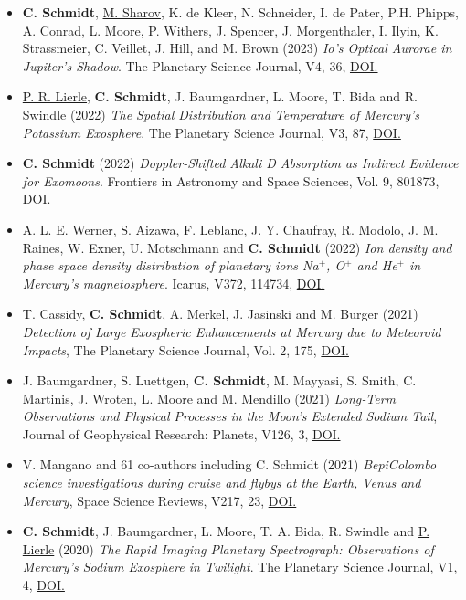 \documentclass[12pt]{report}
\begin{document}
\begin{itemize}
  \item \textbf{C. Schmidt}, \underline{M. Sharov}, K. de Kleer, N. Schneider, I. de Pater, P.H. Phipps, A. Conrad, L. Moore, P. Withers, J. Spencer, J. Morgenthaler, I. Ilyin, K. Strassmeier, C. Veillet, J. Hill, and M. Brown (2023) \textit{Io’s Optical Aurorae in Jupiter’s Shadow}. The Planetary Science Journal, V4, 36, \href{https://doi.org/10.3847/PSJ/ac85b0}{DOI.} 
  \item \underline{P. R. Lierle}, \textbf{C. Schmidt}, J. Baumgardner, L. Moore, T. Bida and R. Swindle (2022) \textit{The Spatial Distribution and Temperature of Mercury’s Potassium Exosphere}. The Planetary Science Journal, V3, 87, \href{https://doi.org/10.3847/PSJ/ac5c4d}{DOI.} 
  \item \textbf{C. Schmidt} (2022) \textit{Doppler-Shifted Alkali D Absorption as Indirect Evidence for Exomoons}. Frontiers in Astronomy and Space Sciences, Vol. 9, 801873, \href{https://doi.org/10.3389/fspas.2022.801873}{DOI.}
  \item A. L. E. Werner, S. Aizawa, F. Leblanc, J. Y. Chaufray, R. Modolo, J. M. Raines, W. Exner, U. Motschmann and \textbf{C. Schmidt} (2022) \textit{Ion density and phase space density distribution of planetary ions Na$^+$, O$^+$ and He$^+$ in Mercury's magnetosphere}. Icarus, V372, 114734, \href{https://doi.org/10.1016/j.icarus.2021.114734}{DOI.}
  \item  T. Cassidy, \textbf{C. Schmidt}, A. Merkel, J. Jasinski and M. Burger (2021) \textit{Detection of Large Exospheric Enhancements at Mercury due to Meteoroid Impacts}, The Planetary Science Journal, Vol. 2, 175, \href{https://doi.org/10.3847/PSJ/ac1a19}{DOI.}
  \item J. Baumgardner, S. Luettgen, \textbf{C. Schmidt}, M. Mayyasi, S. Smith, C. Martinis, J. Wroten, L. Moore and M. Mendillo (2021) \textit{Long‐Term Observations and Physical Processes in the Moon’s Extended Sodium Tail}, Journal of Geophysical Research: Planets, V126, 3, \href{https://doi.org/10.1029/2020JE006671}{DOI.}
  \item V. Mangano and 61 co-authors including C. Schmidt (2021) \textit{BepiColombo science investigations during cruise and flybys at the Earth, Venus and Mercury}, Space Science Reviews, V217, 23, \href{https://doi.org/10.1007/s11214-021-00797-9}{DOI.} 
  \item \textbf{C. Schmidt}, J. Baumgardner, L. Moore, T. A. Bida, R. Swindle and \underline{P. Lierle} (2020) \textit{The Rapid Imaging Planetary Spectrograph: Observations of Mercury's Sodium Exosphere in Twilight}. The Planetary Science Journal, V1, 4, \href{https://doi.org/10.3847/PSJ/ab76c9}{DOI.}

\end{itemize}
\end{document}
